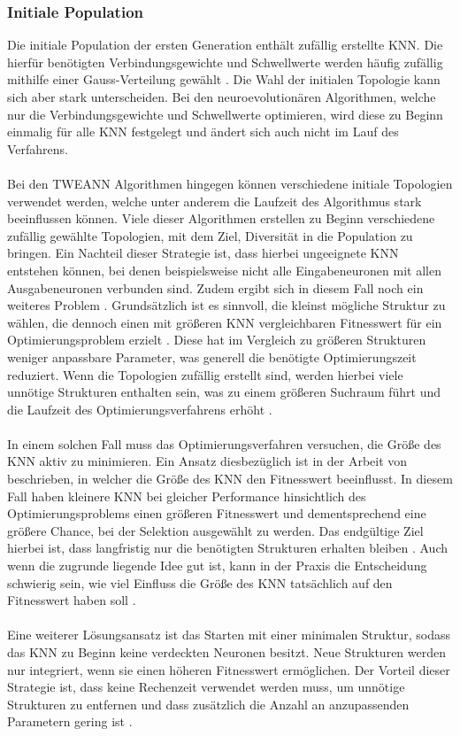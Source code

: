 \subsubsection{Initiale Population}
Die initiale Population der ersten Generation enthält zufällig erstellte \ac{KNN}. Die hierfür benötigten Verbindungsgewichte und Schwellwerte werden häufig zufällig mithilfe einer Gauss-Verteilung gewählt \cite{mcintyre_neatpython}. Die Wahl der initialen Topologie kann sich aber stark unterscheiden. Bei den neuroevolutionären Algorithmen, welche nur die Verbindungsgewichte und Schwellwerte optimieren, wird diese zu Beginn einmalig für alle \ac{KNN} festgelegt und ändert sich auch nicht im Lauf des Verfahrens. 
\\\\
Bei den \ac{TWEANN} Algorithmen hingegen können verschiedene initiale Topologien verwendet werden, welche unter anderem die Laufzeit des Algorithmus stark beeinflussen können. Viele dieser Algorithmen erstellen zu Beginn verschiedene zufällig gewählte Topologien, mit dem Ziel, Diversität in die Population zu bringen. Ein Nachteil dieser Strategie ist, dass hierbei ungeeignete \ac{KNN} entstehen können, bei denen beispielsweise nicht alle Eingabeneuronen mit allen Ausgabeneuronen verbunden sind. Zudem ergibt sich in diesem Fall noch ein weiteres Problem \cite{stanley2002evolving}. Grundsätzlich ist es sinnvoll, die kleinst mögliche Struktur zu wählen, die dennoch einen mit größeren \ac{KNN} vergleichbaren Fitnesswert für ein Optimierungsproblem erzielt \cite{zhang1993evolving}. Diese hat im Vergleich zu größeren Strukturen weniger anpassbare Parameter, was generell die benötigte Optimierungszeit reduziert. Wenn die Topologien zufällig erstellt sind, werden hierbei viele unnötige Strukturen enthalten sein, was zu einem größeren Suchraum führt und die Laufzeit des Optimierungsverfahrens erhöht \cite{stanley2002evolving}. 
\\\\
In einem solchen Fall muss das Optimierungsverfahren versuchen, die Größe des \ac{KNN} aktiv zu minimieren. Ein Ansatz diesbezüglich ist in der Arbeit von \citeauthor{zhang1993evolving} beschrieben, in welcher die Größe des \ac{KNN} den Fitnesswert beeinflusst. In diesem Fall haben kleinere \ac{KNN} bei gleicher Performance hinsichtlich des Optimierungsproblems einen größeren Fitnesswert und dementsprechend eine größere Chance, bei der Selektion ausgewählt zu werden. Das endgültige Ziel hierbei ist, dass langfristig nur die benötigten Strukturen erhalten bleiben \cite{zhang1993evolving}. Auch wenn die zugrunde liegende Idee gut ist, 
kann in der Praxis die Entscheidung schwierig sein, wie viel Einfluss die Größe des \ac{KNN} tatsächlich auf den Fitnesswert haben soll \cite{stanley2002evolving}.
\\\\
Eine weiterer Lösungsansatz ist das Starten mit einer minimalen Struktur, sodass das \ac{KNN} zu Beginn keine verdeckten Neuronen besitzt. Neue Strukturen werden nur integriert, wenn sie einen höheren Fitnesswert ermöglichen. Der Vorteil dieser Strategie ist, dass keine Rechenzeit verwendet werden muss, um unnötige Strukturen zu entfernen und dass zusätzlich die Anzahl an anzupassenden Parametern gering ist \cite{stanley2002evolving}.

